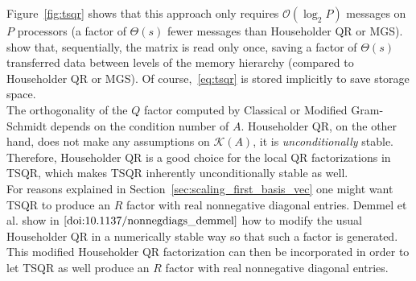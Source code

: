 \documentclass{scrartcl}
\numberwithin{equation}{section}
\begin{document}
Figure~\ref{fig:tsqr} shows that this approach only requires $\mathcal{O}(\log_2 P)$ messages on $P$ processors (a factor of $\Theta (s)$ fewer messages than Householder QR or MGS). \cite{Demmel:2012:CA-QR_demmel} show that, sequentially, the matrix is read only once, saving a factor of $\Theta(s)$ transferred data between levels of the memory hierarchy (compared to Householder QR or MGS). 
Of course,~\eqref{eq:tsqr} is stored implicitly to save storage space.\\
The orthogonality of the $Q$ factor computed by Classical or Modified Gram-Schmidt depends on the condition number of $A$. Householder QR, on the other hand, does not make any assumptions on $\mathcal{K}(A)$, it is \textit{unconditionally} stable. Therefore, Householder QR is a good choice for the local QR factorizations in TSQR, which makes TSQR inherently unconditionally stable as well.\\

For reasons explained in Section~\ref{sec:scaling_first_basis_vec} one might want TSQR to produce an $R$ factor with real nonnegative diagonal entries. Demmel et al. show in $\cite{doi:10.1137/nonnegdiags_demmel} $ how to modify the usual Householder QR in a numerically stable way so that such a factor is generated. This modified Householder QR factorization can then be incorporated in order to let TSQR as well produce an $R$ factor with real nonnegative diagonal entries.
\end{document}
